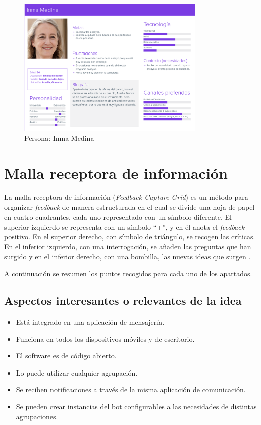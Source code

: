 \begin{figure}[h]
\centering
\includegraphics[width=0.8\textwidth]{imagenes/personas/persona_inma.png}
\caption{Persona: Inma Medina}
\label{fig:persona_inma}
\end{figure}

\section{Malla receptora de información}\label{section:feedbackCaptureGrid}

La malla receptora de información (\textit{Feedback Capture Grid}) es un método para organizar \textit{feedback} de manera estructurada en el cual se divide una hoja de papel en cuatro cuadrantes, cada uno representado con un símbolo diferente. El superior izquierdo se representa con un símbolo ``+'', y en él anota el \textit{feedback} positivo. En el superior derecho, con símbolo de triángulo, se recogen las críticas. En el inferior izquierdo, con una interrogación, se añaden las preguntas que han surgido y en el inferior derecho, con una bombilla, las nuevas ideas que surgen \cite{feedbackCaptureGrid}.

A continuación se resumen los puntos recogidos para cada uno de los apartados.

\subsection{Aspectos interesantes o relevantes de la idea}

\begin{itemize}
    \item Está integrado en una aplicación de mensajería.
    \item Funciona en todos los dispositivos móviles y de escritorio.
    \item El software es de código abierto.
    \item Lo puede utilizar cualquier agrupación.
    \item Se reciben notificaciones a través de la misma aplicación de comunicación.
    \item Se pueden crear instancias del bot configurables a las necesidades de distintas agrupaciones.
\end{itemize}

